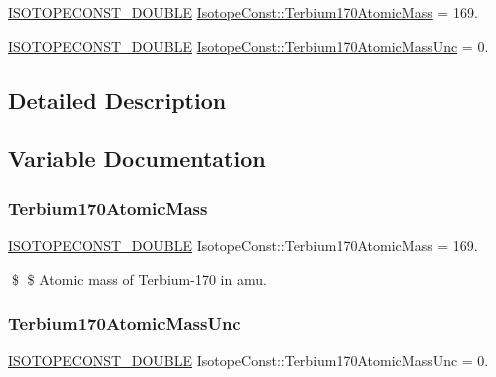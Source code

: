 \begin{DoxyCompactItemize}
\item 
\mbox{\hyperlink{group___isotope_const-_macros_ga8f45a7272ce02c0b4c65c44636ed719a}{I\+S\+O\+T\+O\+P\+E\+C\+O\+N\+S\+T\+\_\+\+D\+O\+U\+B\+LE}} \mbox{\hyperlink{group___isotope_const-_terbium-_tb170_ga3ea0188e0fb001cd8b0ec7abfe6c9e63}{Isotope\+Const\+::\+Terbium170\+Atomic\+Mass}} = 169.
\item 
\mbox{\hyperlink{group___isotope_const-_macros_ga8f45a7272ce02c0b4c65c44636ed719a}{I\+S\+O\+T\+O\+P\+E\+C\+O\+N\+S\+T\+\_\+\+D\+O\+U\+B\+LE}} \mbox{\hyperlink{group___isotope_const-_terbium-_tb170_gaecc8a08c24f2e8611a5a67e402b17465}{Isotope\+Const\+::\+Terbium170\+Atomic\+Mass\+Unc}} = 0.
\end{DoxyCompactItemize}


\subsection{Detailed Description}


\subsection{Variable Documentation}
\mbox{\label{group___isotope_const-_terbium-_tb170_ga3ea0188e0fb001cd8b0ec7abfe6c9e63}} 
\subsubsection{\texorpdfstring{Terbium170\+Atomic\+Mass}{Terbium170AtomicMass}}
{\footnotesize\ttfamily \mbox{\hyperlink{group___isotope_const-_macros_ga8f45a7272ce02c0b4c65c44636ed719a}{I\+S\+O\+T\+O\+P\+E\+C\+O\+N\+S\+T\+\_\+\+D\+O\+U\+B\+LE}} Isotope\+Const\+::\+Terbium170\+Atomic\+Mass = 169.}

\$ \$ Atomic mass of Terbium-\/170 in amu. \mbox{\label{group___isotope_const-_terbium-_tb170_gaecc8a08c24f2e8611a5a67e402b17465}} 
\subsubsection{\texorpdfstring{Terbium170\+Atomic\+Mass\+Unc}{Terbium170AtomicMassUnc}}
{\footnotesize\ttfamily \mbox{\hyperlink{group___isotope_const-_macros_ga8f45a7272ce02c0b4c65c44636ed719a}{I\+S\+O\+T\+O\+P\+E\+C\+O\+N\+S\+T\+\_\+\+D\+O\+U\+B\+LE}} Isotope\+Const\+::\+Terbium170\+Atomic\+Mass\+Unc = 0.}

